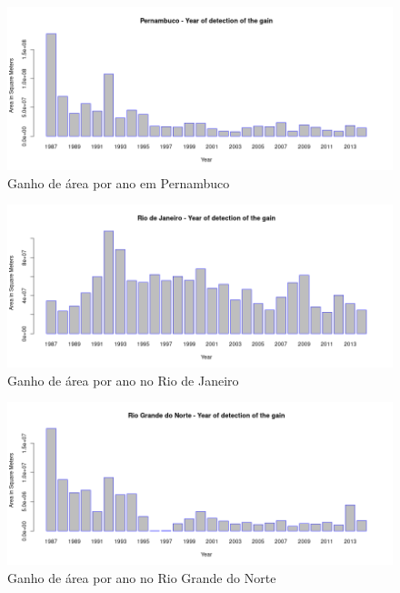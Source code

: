 \begin{figure}[H]
    \centering
    \includegraphics[scale=.5]{images/gain_graphics/Pernambuco_gain.png}
    \caption{Ganho de área por ano em Pernambuco}
    \label{fig:gain_pernambuco}
\end{figure}

\begin{figure}[H]
    \centering
    \includegraphics[scale=.5]{images/gain_graphics/Rio de Janeiro_gain.png}
    \caption{Ganho de área por ano no Rio de Janeiro}
    \label{fig:gain_rio_de_janeiro}
\end{figure}

\begin{figure}[H]
    \centering
    \includegraphics[scale=.5]{images/gain_graphics/Rio Grande do Norte_gain.png}
    \caption{Ganho de área por ano no Rio Grande do Norte}
    \label{fig:gain_rio_grande_do_norte}
\end{figure}

